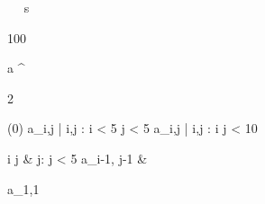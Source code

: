 \begin{eqcode}{\mu}{\ }{\ }{}
  s \gets \begin {tmatrix}
  100  \lend
  \end{tmatrix} \lend
   \lend
  a \gets \genar \limits ^{\begin{tmatrix} 2  \lend \end{tmatrix}} (0) \lend
   \lend
  a_{i,j} | i,j : i < 5 \cap j < 5  \lend
   \lend
  a_{i,j} | i,j : i  \cap j < 10 \gets
  \begin{cases}
    i \cdot j & j: j < 5 \lend
    a_{i-1, j-1} & \otherwise \lend
  \end{cases} \lend
   \lend
  a_{1,1}  \lend
   \lend
   \lend
\end{eqcode}
